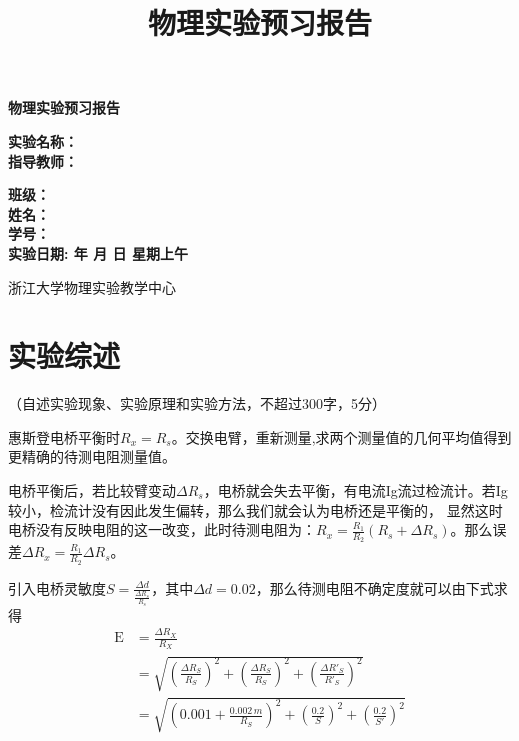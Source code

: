 \documentclass[10pt,a4paper]{ctexart}
\title{\xiaochu\textbf{物理实验预习报告}}
\author{}
\date{}
\newcommand{\myspace}[1]{\par\vspace{#1\baselineskip}} %
\newcommand{\xiaochu}{\fontsize{36pt}{42pt}\selectfont}
\newcommand{\sanhao}{\fontsize{16pt}{20pt}\selectfont}
\newcommand{\sihao}{\fontsize{14pt}{18pt}\selectfont}
\newcommand{\xiaosi}{\fontsize{12pt}{16pt}\selectfont}
\begin{document}
\vspace*{36pt} %

\begin{center}   
    \xiaochu\textbf{物理实验预习报告}
    \vspace{13pt}
    \vspace{13pt}
    \vspace{13pt}
    \vspace{13pt}
    
    \sanhao\textbf{实验名称：\underline{}} \\[10pt]
    \sanhao\textbf{指导教师：\underline{}} \\[30pt]
    
    \myspace{6}
    
   \sihao\textbf{班级：\underline{\makebox[6cm]{}}} \\[10pt]
    \sihao\textbf{姓名：\underline{\makebox[6cm]{}}} \\[10pt]
    \sihao\textbf{学号：\underline{\makebox[6cm]{}}} \\[30pt]
    
   \sihao\textbf{实验日期: 
   \underline{}  年 
   \underline{}月
   \underline{}日  
   星期\underline{}上午}
    
    \vspace{18pt}
    \sihao 浙江大学物理实验教学中心
    
\end{center}

\newpage

    \section{实验综述}
    
    \xiaosi （自述实验现象、实验原理和实验方法，不超过300字，5分）

    惠斯登电桥平衡时$R_x=R_s$。交换电臂，重新测量,求两个测量值的几何平均值得到更精确的待测电阻测量值。

    电桥平衡后，若比较臂变动$\Delta R_s$，电桥就会失去平衡，有电流Ig流过检流计。若Ig较小，检流计没有因此发生偏转，那么我们就会认为电桥还是平衡的，
    显然这时电桥没有反映电阻的这一改变，此时待测电阻为：$R_x=\frac{R_1}{R_2}(R_s+\Delta R_s)$。那么误差$\Delta R_x=\frac{R_1}{R_2}\Delta R_s$。

    引入电桥灵敏度$S=\frac{\Delta d}{\frac{\Delta R_s}{R_s}}$，其中$\Delta d=0.02$，那么待测电阻不确定度就可以由下式求得
   \begin{align}
\mathrm{E} &= \frac{\Delta R_X}{R_X} \\
           &= \sqrt{
                \left( \frac{\Delta R_S}{R_S} \right)^2 
              + \left( \frac{\Delta R_S}{R_S} \right)^2 
              + \left( \frac{\Delta R'_S}{R'_S} \right)^2
              } \\
           &= \sqrt{
                \left( 0.001 + \frac{0.002\,m}{R_S} \right)^2 
              + \left( \frac{0.2}{S} \right)^2 
              + \left( \frac{0.2}{S'} \right)^2
              }
\end{align}
\end{document}
